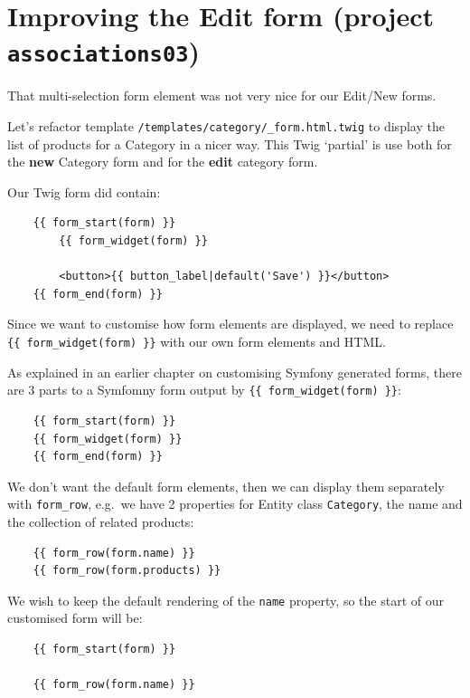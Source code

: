 \documentclass[a4paperpaper,openright]{book}
\begin{document}
\hypertarget{improving-the-edit-form-project-associations03}{%
\section{\texorpdfstring{Improving the Edit form (project
\texttt{associations03})}{Improving the Edit form (project associations03)}}\label{improving-the-edit-form-project-associations03}}

That multi-selection form element was not very nice for our Edit/New
forms.

Let's refactor template \texttt{/templates/category/\_form.html.twig} to
display the list of products for a Category in a nicer way. This Twig
`partial' is use both for the \textbf{new} Category form and for the
\textbf{edit} category form.

Our Twig form did contain:

\begin{verbatim}
    {{ form_start(form) }}
        {{ form_widget(form) }}

        <button>{{ button_label|default('Save') }}</button>
    {{ form_end(form) }}
\end{verbatim}

Since we want to customise how form elements are displayed, we need to
replace \texttt{\{\{\ form\_widget(form)\ \}\}} with our own form
elements and HTML.

As explained in an earlier chapter on customising Symfony generated
forms, there are 3 parts to a Symfomny form output by
\texttt{\{\{\ form\_widget(form)\ \}\}}:

\begin{verbatim}
    {{ form_start(form) }}
    {{ form_widget(form) }}
    {{ form_end(form) }}
\end{verbatim}

We don't want the default form elements, then we can display them
separately with \texttt{form\_row}, e.g.~we have 2 properties for Entity
class \texttt{Category}, the name and the collection of related
products:

\begin{verbatim}
    {{ form_row(form.name) }}
    {{ form_row(form.products) }}
\end{verbatim}

We wish to keep the default rendering of the \texttt{name} property, so
the start of our customised form will be:

\begin{verbatim}
    {{ form_start(form) }}
    
    {{ form_row(form.name) }}
\end{verbatim}
\end{document}
